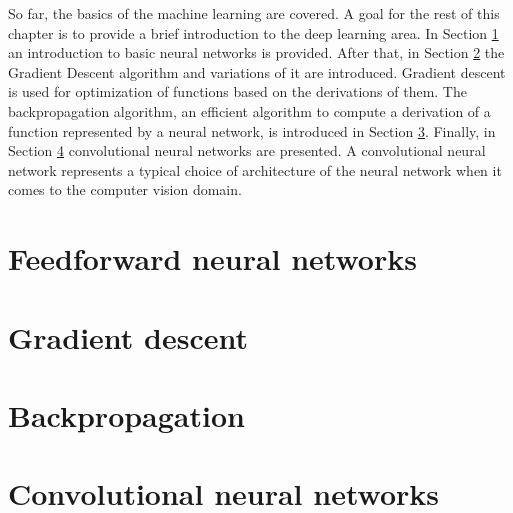 So far, the basics of the machine learning are covered. A goal for the rest of this chapter is to provide a brief introduction to the deep learning area. In Section \ref{subsection:FNN} an introduction to basic neural networks is provided. After that, in Section \ref{subsection:gradient-descent} the Gradient Descent algorithm and variations of it are introduced. Gradient descent is used for optimization of functions based on the derivations of them. The backpropagation algorithm, an efficient algorithm to compute a derivation of a function represented by a neural network, is introduced in Section \ref{subsection:backpropagation}. Finally, in Section \ref{subsection:convolutionalNN} convolutional neural networks are presented. A convolutional neural network represents a typical choice of architecture of the neural network when it comes to the computer vision domain.

\section{Feedforward neural networks}
\label{subsection:FNN}


\section{Gradient descent}
\label{subsection:gradient-descent}


\section{Backpropagation}
\label{subsection:backpropagation}


\section{Convolutional neural networks}
\label{subsection:convolutionalNN}

